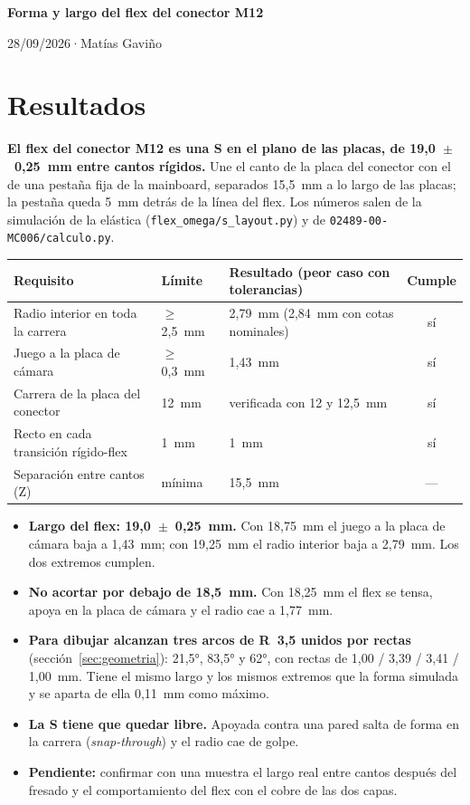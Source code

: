 \documentclass[11pt,a4paper]{article}
\newcommand{\titulo}{Forma y largo del flex del conector M12}
\newcommand{\autor}{Matías Gaviño}
\newcommand{\fecha}{28/09/2026}                    %
\newcommand{\cabecera}{%
  \thispagestyle{fancy}%
  {\fontsize{20}{24}\selectfont\bfseries\titulo\par}%
  \vspace{5pt}%
  {\small\color{gris-medio}\fecha\quad·\quad\autor\par}%
  \vspace{6pt}}
\begin{document}
\cabecera

\section{Resultados}
\textbf{El flex del conector M12 es una S en el plano de las placas, de 19,0~$\pm$~0,25~mm entre cantos
rígidos.} Une el canto de la placa del conector con el de una pestaña fija de la mainboard, separados
15,5~mm a lo largo de las placas; la pestaña queda 5~mm detrás de la línea del flex. Los números salen de la simulación
de la elástica (\texttt{flex\_omega/s\_layout.py}) y de \texttt{02489-00-MC006/calculo.py}.

\begin{table}[H]\centering\small
\begin{tabular}{l l l c}
\toprule
Requisito & Límite & Resultado (peor caso con tolerancias) & Cumple\\
\midrule
Radio interior en toda la carrera & $\geq$ 2,5~mm & 2,79~mm (2,84~mm con cotas nominales) & sí\\
Juego a la placa de cámara & $\geq$ 0,3~mm & 1,43~mm & sí\\
Carrera de la placa del conector & 12~mm & verificada con 12 y 12,5~mm & sí\\
Recto en cada transición rígido-flex & 1~mm & 1~mm & sí\\
Separación entre cantos (Z) & mínima & 15,5~mm & ---\\
\bottomrule
\end{tabular}
\end{table}

\begin{itemize}
  \item \textbf{Largo del flex: 19,0~$\pm$~0,25~mm.} Con 18,75~mm el juego a la placa de cámara baja a
        1,43~mm; con 19,25~mm el radio interior baja a 2,79~mm. Los dos extremos cumplen.
  \item \textbf{No acortar por debajo de 18,5~mm.} Con 18,25~mm el flex se tensa, apoya en la placa de
        cámara y el radio cae a 1,77~mm.
  \item \textbf{Para dibujar alcanzan tres arcos de R~3,5 unidos por rectas} (sección~\ref{sec:geometria}):
        21,5°, 83,5° y 62°, con rectas de 1,00 / 3,39 / 3,41 / 1,00~mm. Tiene el mismo largo y los
        mismos extremos que la forma simulada y se aparta de ella 0,11~mm como máximo.
  \item \textbf{La S tiene que quedar libre.} Apoyada contra una pared salta de forma en la carrera
        (\emph{snap-through}) y el radio cae de golpe.
  \item \textbf{Pendiente:} confirmar con una muestra el largo real entre cantos después del fresado y el
        comportamiento del flex con el cobre de las dos capas.
\end{itemize}
\end{document}
